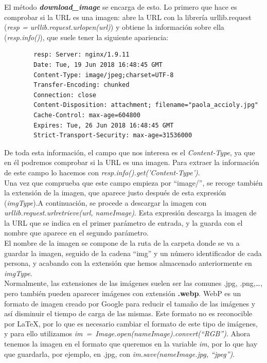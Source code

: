 \documentclass[a4paper, 12pt]{book}
\begin{document}
El método \textbf{\textit{download\_image}} se encarga de esto. Lo primero que hace es comprobar si la URL es una imagen: abre la URL con la librería urllib.request (\textit{resp = urllib.request.urlopen(url)}) y obtiene la información sobre ella (\textit{resp.info()}), que suele tener la siguiente apariencia:
\newpage
\begin{verbatim}
        resp: Server: nginx/1.9.11
        Date: Tue, 19 Jun 2018 16:48:45 GMT
        Content-Type: image/jpeg;charset=UTF-8
        Transfer-Encoding: chunked
        Connection: close
        Content-Disposition: attachment; filename="paola_accioly.jpg"
        Cache-Control: max-age=604800
        Expires: Tue, 26 Jun 2018 16:48:45 GMT
        Strict-Transport-Security: max-age=31536000
\end{verbatim}

De toda esta información, el campo que nos interesa es el \textit{Content-Type}, ya que en él podremos comprobar si la URL es una imagen. Para extraer la información de este campo lo hacemos con \textit{resp.info().get('Content-Type')}.\\

Una vez que comprueba que este campo empieza por ``image/'', se recoge también la extensión de la imagen, que aparece justo después de esta expresión (\textit{imgType}).A continuación, se procede a descargar la imagen con \textit{urllib.request.urlretrieve(url, nameImage)}. Esta expresión descarga la imagen de la URL que se indica en el primer parámetro de entrada, y la guarda con el nombre que aparece en el segundo parámetro.\\

El nombre de la imagen se compone de la ruta de la carpeta donde se va a guardar la imagen, seguido de la cadena ``img'' y un número identificador de cada persona, y acabando con la extensión que hemos almacenado anteriormente en \textit{imgType}.\\

Normalmente, las extensiones de las imágenes suelen ser las comunes .jpg, .png,\ldots, pero también pueden aparecer imágenes con extensión \textbf{.webp}. WebP es un formato de imagen creado por Google para reducir el tamaño de las imágenes y así disminuir el tiempo de carga de las mismas. Este formato no es reconocible por \LaTeX, por lo que es necesario cambiar el formato de este tipo de imágenes, y para ello utilizamos \mbox{\textit{im = Image.open(nameImage).convert(``RGB'')}}. Ahora tenemos la imagen en el formato que queremos en la variable \textit{im}, por lo que hay que guardarla, por ejemplo, en .jpg, con \textit{im.save(nameImage.jpg, ``jpeg'')}.\\
\end{document}
